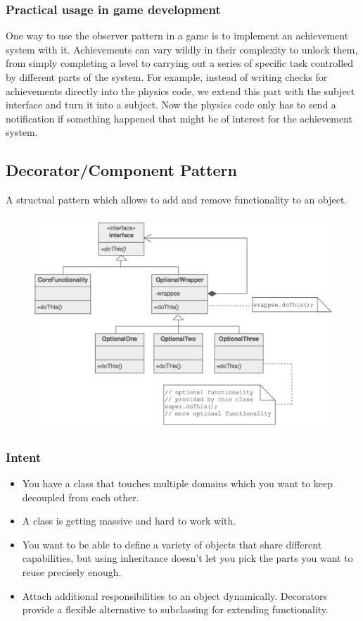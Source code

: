 \subsubsection{Practical usage in game development}
One way to use the observer pattern in a game is to implement an achievement system with it.
Achievements can vary wildly in their complexity to unlock them, from simply completing a level to carrying out a series of specific task controlled by different parts of the system. For example, instead of writing checks for achievements directly into the physics code, we extend this part with the subject interface and turn it into a subject. Now the physics code only has to send a notification if something happened that might be of interest for the achievement system. 




\subsection{Decorator/Component Pattern}
A structual pattern which allows to add and remove functionality to an object.

\begin{figure}[!hbp]
\includegraphics[width=\textwidth, height=8cm]{img/pics/decorator.PNG}
\caption{ \protect \cite{Shvets}}
\label{fig:ref_decorator}
\end{figure}
\subsubsection{Intent}
\begin{itemize} 
\item You have a class that touches multiple domains which you want to keep decoupled from each other.
\item A class is getting massive and hard to work with.
\item You want to be able to define a variety of objects that share different capabilities, but using inheritance doesn’t let you pick the parts you want to reuse precisely enough.
\item Attach additional responsibilities to an object dynamically. Decorators provide a flexible alternative to subclassing for extending functionality.
\end{itemize} 
\citep{Shvets}
\citep{nystrom2014game}

